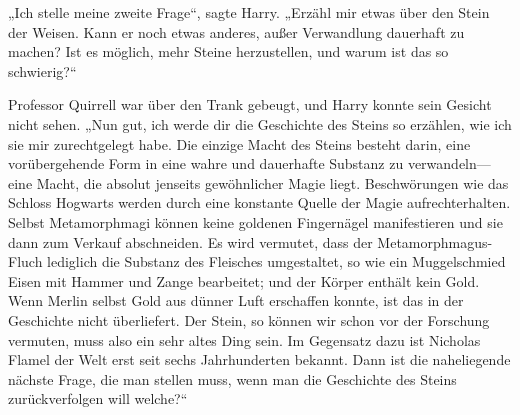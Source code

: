 „Ich stelle meine zweite Frage“, sagte Harry. „Erzähl mir etwas über den Stein der Weisen. Kann er noch etwas anderes, außer Verwandlung dauerhaft zu machen? Ist es möglich, mehr Steine herzustellen, und warum ist das so schwierig?“

Professor Quirrell war über den Trank gebeugt, und Harry konnte sein Gesicht nicht sehen.
„Nun gut, ich werde dir die Geschichte des Steins so erzählen, wie ich sie mir zurechtgelegt habe. Die einzige Macht des Steins besteht darin, eine vorübergehende Form in eine wahre und dauerhafte Substanz zu verwandeln—eine Macht, die absolut jenseits gewöhnlicher Magie liegt. Beschwörungen wie das Schloss Hogwarts werden durch eine konstante Quelle der Magie aufrechterhalten. Selbst Metamorphmagi können keine goldenen Fingernägel manifestieren und sie dann zum Verkauf abschneiden. Es wird vermutet, dass der Metamorphmagus-Fluch lediglich die Substanz des Fleisches umgestaltet, so wie ein Muggelschmied Eisen mit Hammer und Zange bearbeitet; und der Körper enthält kein Gold. Wenn Merlin selbst Gold aus dünner Luft erschaffen konnte, ist das in der Geschichte nicht überliefert. Der Stein, so können wir schon vor der Forschung vermuten, muss also ein sehr altes Ding sein. Im Gegensatz dazu ist Nicholas Flamel der Welt erst seit sechs Jahrhunderten bekannt. Dann ist die naheliegende nächste Frage, die man stellen muss, wenn man die Geschichte des Steins zurückverfolgen will welche?“

